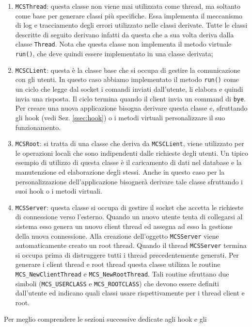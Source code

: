\begin{enumerate}
\item \verb|MCSThread|: questa classe non viene mai utilizzata come
  thread, ma soltanto come base per generare classi pi\`u
  specifiche. Essa implementa il meccanismo di log e tracciamento
  degli errori utilizzato nelle classi derivate. Tutte le classi
  descritte di seguito derivano infatti da questa che a sua volta
  deriva dalla classe \verb|Thread|. Nota che questa classe non
  implementa il metodo virtuale \verb|run()|, che deve quindi essere
  implementato in una classe derivata;
\item \verb|MCSCLient|: questa \`e la classe base che si occupa di
  gestire la comunicazione con gli utenti. In questo caso abbiamo
  implementato il metodo \verb|run()| come un ciclo che legge dal
  socket i comandi inviati dall'utente, li elabora e quindi invia una
  risposta. Il ciclo termina quando il client invia un command di
  \verb|bye|. Per creare una nuova applicazione bisogna derivare
  questa classe e, sfruttando gli hook (vedi Sez. \ref{ssec:hook}) o i
  metodi virtuali personalizzare il suo funzionamento.
\item \verb|MCSRoot|: si tratta di una classe che deriva da
  \verb|MCSCLient|, viene utilizzato per le operazioni locali che sono
  indipendenti dalle richieste degli utenti. Un tipico esempio di
  utilizzo di questa classe \`e il caricamento di dati nel database e
  la manutenzione ed elaborazione degli stessi. Anche in questo caso
  per la personalizzazione dell'applicazione bisogner\`a derivare tale
  classe sfruttando i suoi hook o i metodi virtuali.
\item \verb|MCSServer|: questa classe si occupa di gestire il socket
  che accetta le richieste di connessione verso l'esterno. Quando un
  nuovo utente tenta di collegarsi al sistema esso genera un nuovo
  client thread ed assegna ad esso la gestione della nuova
  connessione. Alla creazione dell'oggetto \verb|MCSServer| viene
  automaticamente creato un root thread. Quando il thread
  \verb|MCSServer| termina si occupa prima di distruggere tutti i
  thread precedentemente generati. Per generare i client thread e root
  thread questa classe utilizza le routine \verb|MCS_NewClientThread|
  e \verb|MCS_NewRootThread|. Tali routine sfruttano due simboli
  (\verb|MCS_USERCLASS| e \verb|MCS_ROOTCLASS|) che
  devono essere definiti dall'utente ed indicano quali classi usare
  rispettivamente per i thread client e root.
\end{enumerate}
%
Per meglio comprendere le sezioni successive dedicate agli hook e gli

